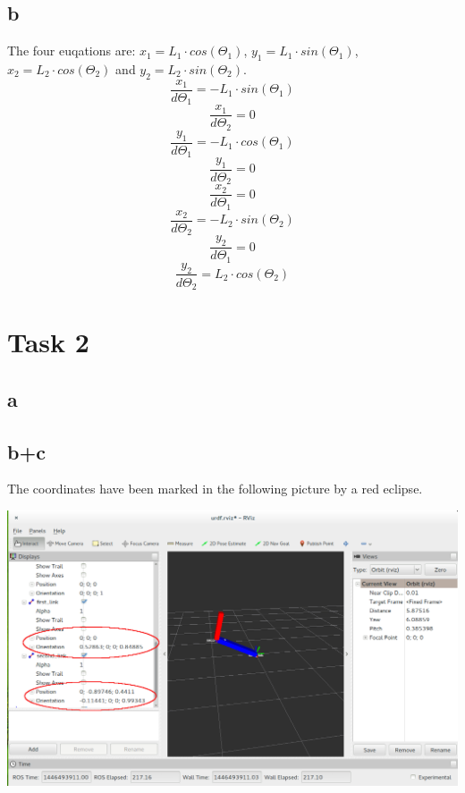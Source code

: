 \subsection{b}\label{ass2_t1_b}

The four euqations are: $x_{1} = L_{1}\cdot cos(\Theta_{1})$, $y_{1} = L_{1}\cdot sin(\Theta_{1})$, $x_{2} = L_{2}\cdot cos(\Theta_{2})$ and $y_{2} = L_{2}\cdot sin(\Theta_{2})$.
\begin{equation}
  \frac{x_{1}}{d\Theta_{1}} = -L_{1}\cdot sin(\Theta_{1})
\end{equation}
\begin{equation}
  \frac{x_{1}}{d\Theta_{2}} = 0
\end{equation}
\begin{equation}
  \frac{y_{1}}{d\Theta_{1}} = -L_{1}\cdot cos(\Theta_{1})
\end{equation}
\begin{equation}
  \frac{y_{1}}{d\Theta_{2}} = 0
\end{equation}
\begin{equation}
  \frac{x_{2}}{d\Theta_{1}} = 0
\end{equation}
\begin{equation}
  \frac{x_{2}}{d\Theta_{2}} = -L_{2}\cdot sin(\Theta_{2})
\end{equation}
\begin{equation}
  \frac{y_{2}}{d\Theta_{1}} = 0
\end{equation}
\begin{equation}
  \frac{y_{2}}{d\Theta_{2}} = L_{2}\cdot cos(\Theta_{2})
\end{equation}


\section{Task 2}\label{ass2_t2}

\subsection{a}\label{ass2_t2_a}



\subsection{b+c}\label{ass2_t2_b_c}

The coordinates have been marked in the following picture by a red eclipse.

\includegraphics[width=\textwidth]{img/screen_ue2_t2_c.png}

